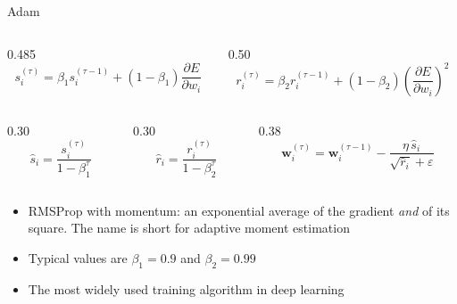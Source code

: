 \documentclass[10pt,aspectratio=169]{beamer}
\begin{document}
\begin{frame}{Adam}
  \vspace{-0.55em}
  \begin{columns}[T, onlytextwidth]
    \begin{column}{0.485\textwidth}
      \[ s^{(\tau)}_i = \beta_1 s^{(\tau-1)}_i
         + (1-\beta_1)\frac{\partial E}{\partial w_i} \]
    \end{column}
    \begin{column}{0.50\textwidth}
      \[ r^{(\tau)}_i = \beta_2 r^{(\tau-1)}_i
         + (1-\beta_2)\left(\frac{\partial E}{\partial w_i}\right)^{2} \]
    \end{column}
  \end{columns}
  \vspace{-0.55em}
  \begin{columns}[T, onlytextwidth]
    \begin{column}{0.30\textwidth}
      \[ \hat s_i = \frac{s^{(\tau)}_i}{1-\beta_1^{\tau}} \]
    \end{column}
    \begin{column}{0.30\textwidth}
      \[ \hat r_i = \frac{r^{(\tau)}_i}{1-\beta_2^{\tau}} \]
    \end{column}
    \begin{column}{0.38\textwidth}
      \[ \mathbf{w}^{(\tau)}_i = \mathbf{w}^{(\tau-1)}_i
         - \frac{\eta\,\hat s_i}{\sqrt{\hat r_i} + \varepsilon} \]
    \end{column}
  \end{columns}
  \vspace{0.1em}
  \begin{itemize}\itemsep0.3em
    \item RMSProp with momentum: an exponential average of the gradient
          \emph{and} of its square. The name is short for
          \alert{adaptive moment estimation}
    \item Typical values are $\beta_1 = 0.9$ and $\beta_2 = 0.99$
    \item The most widely used training algorithm in deep learning
  \end{itemize}
\end{frame}
\end{document}
